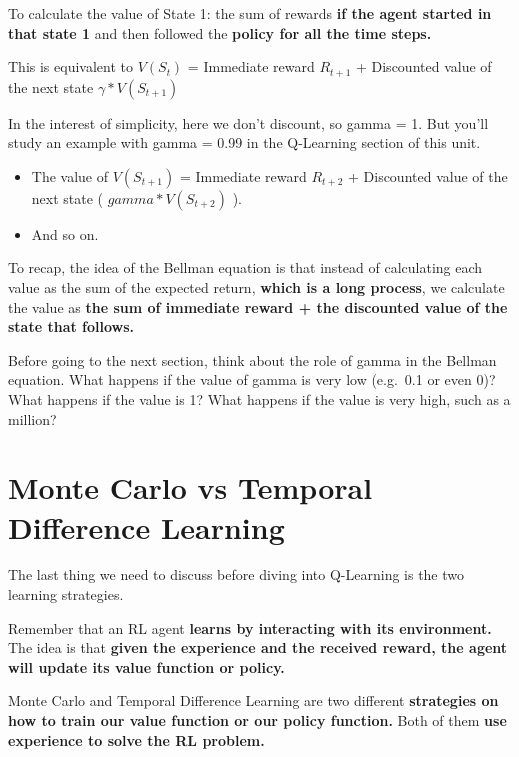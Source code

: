 \documentclass[11pt,a4paper]{article}
\begin{document}
To calculate the value of State 1: the sum of rewards \textbf{if the agent started in that state 1} and then followed the \textbf{policy for all the time steps.}

This is equivalent to \(V(S_{t})\) = Immediate reward \(R_{t+1}\) + Discounted value of the next state \(\gamma * V(S_{t+1})\)


In the interest of simplicity, here we don't discount, so gamma = 1. But you'll study an example with gamma = 0.99 in the Q-Learning section of this unit.

\begin{itemize}
\tightlist
\item
  The value of \(V(S_{t+1})\) = Immediate reward \(R_{t+2}\) + Discounted value of the next state ( \(gamma * V(S_{t+2})\) ).
\item
  And so on.
\end{itemize}

To recap, the idea of the Bellman equation is that instead of calculating each value as the sum of the expected return, \textbf{which is a long process}, we calculate the value as \textbf{the sum of immediate reward + the discounted value of the state that follows.}

Before going to the next section, think about the role of gamma in the Bellman equation. What happens if the value of gamma is very low (e.g.~0.1 or even 0)? What happens if the value is 1? What happens if the value is very high, such as a million?

\section{Monte Carlo vs Temporal Difference Learning}\label{monte-carlo-vs-temporal-difference-learning}

The last thing we need to discuss before diving into Q-Learning is the two learning strategies.

Remember that an RL agent \textbf{learns by interacting with its environment.} The idea is that \textbf{given the experience and the received reward, the agent will update its value function or policy.}

Monte Carlo and Temporal Difference Learning are two different \textbf{strategies on how to train our value function or our policy function.} Both of them \textbf{use experience to solve the RL problem.}
\end{document}
